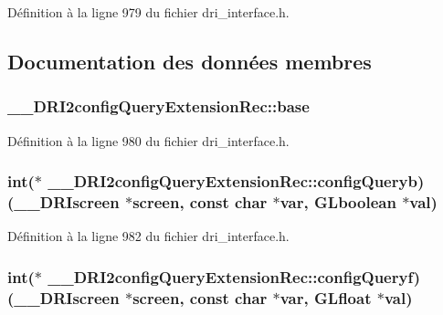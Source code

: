 Définition à la ligne 979 du fichier dri\-\_\-interface.\-h.



\subsection{Documentation des données membres}
\hypertarget{struct_____d_r_i2config_query_extension_rec_a1034a62a113739a223fd6d57a5294564}{
\subsubsection[{base}]{ \-\_\-\-\_\-\-D\-R\-I2config\-Query\-Extension\-Rec\-::base}}\label{struct_____d_r_i2config_query_extension_rec_a1034a62a113739a223fd6d57a5294564}


Définition à la ligne 980 du fichier dri\-\_\-interface.\-h.

\hypertarget{struct_____d_r_i2config_query_extension_rec_ac7614ec002c335e3b9bbf35d2057f239}{
\subsubsection[{config\-Queryb}]{\setlength{\rightskip}{0pt plus 5cm}int($\ast$ \-\_\-\-\_\-\-D\-R\-I2config\-Query\-Extension\-Rec\-::config\-Queryb)({\bf \-\_\-\-\_\-\-D\-R\-Iscreen} $\ast$screen, const char $\ast$var, {\bf G\-Lboolean} $\ast${\bf val})}}\label{struct_____d_r_i2config_query_extension_rec_ac7614ec002c335e3b9bbf35d2057f239}


Définition à la ligne 982 du fichier dri\-\_\-interface.\-h.

\hypertarget{struct_____d_r_i2config_query_extension_rec_a08e40806457fda19b143308d525c7cc1}{
\subsubsection[{config\-Queryf}]{\setlength{\rightskip}{0pt plus 5cm}int($\ast$ \-\_\-\-\_\-\-D\-R\-I2config\-Query\-Extension\-Rec\-::config\-Queryf)({\bf \-\_\-\-\_\-\-D\-R\-Iscreen} $\ast$screen, const char $\ast$var, {\bf G\-Lfloat} $\ast${\bf val})}}\label{struct_____d_r_i2config_query_extension_rec_a08e40806457fda19b143308d525c7cc1}


